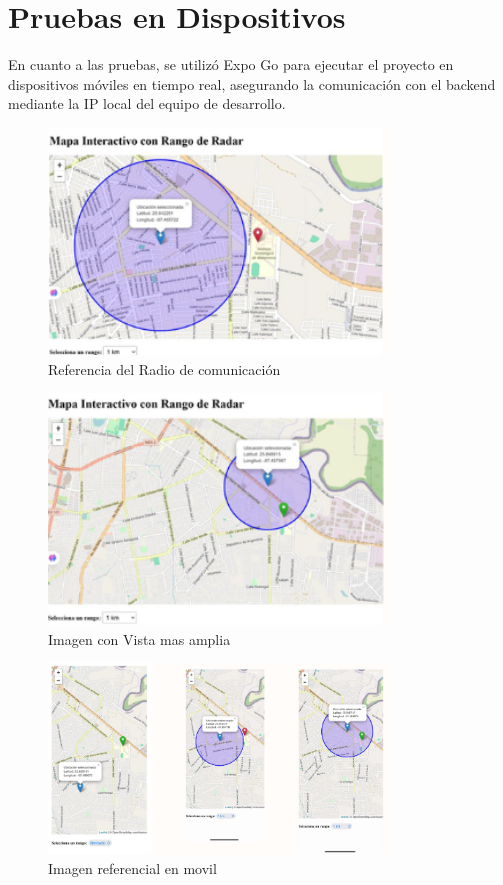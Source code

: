 \documentclass[11pt, a4paper, oneside]{book}
\begin{document}
\section{Pruebas en Dispositivos}
En cuanto a las pruebas, se utilizó Expo Go para ejecutar el proyecto en dispositivos móviles en tiempo real, asegurando la comunicación con el backend mediante la IP local del equipo de desarrollo.
\begin{figure}[H]
\centering
\includegraphics[width=0.8\textwidth]{Pictures/mapa.png}
\caption{Referencia del Radio de comunicación}
\end{figure}

\begin{figure}[H]
\centering
\includegraphics[width=0.8\textwidth]{Pictures/mapa2.png}
\caption{Imagen con Vista mas amplia}

\end{figure}
\begin{figure}[H]
\centering
\includegraphics[width=0.8\textwidth]{Pictures/mapa3.png}
\caption{Imagen referencial en movil}
\end{figure}
\end{document}
